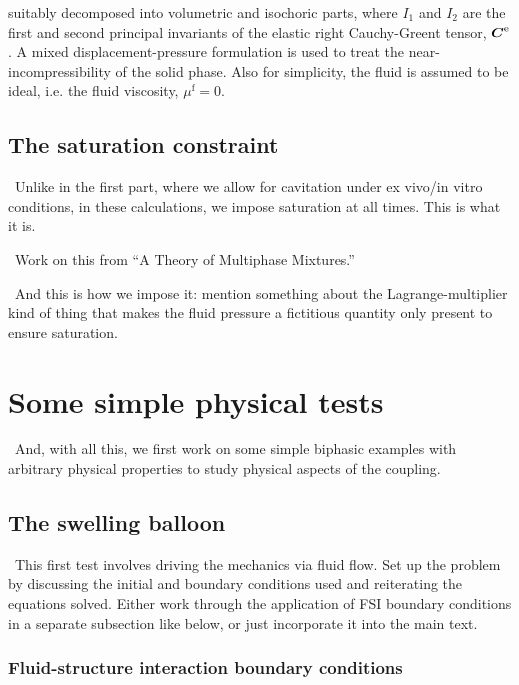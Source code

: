 \noindent suitably decomposed into volumetric and isochoric parts,
where $I_{1}$ and $I_{2}$ are the first and second principal
invariants of the elastic right Cauchy-Greent tensor,
$\mbox{\boldmath$ C$}^{\mathrm{e}}$. A mixed displacement-pressure \citep{ZienkTay:89}
formulation is used to treat the near-incompressibility of the solid
phase. Also for simplicity, the fluid is assumed to be ideal, i.e. the
fluid viscosity, $\mu^{\mathrm{f}}=0$.

\subsection{The saturation constraint}
\label{eu-saturationconstraint}

\textbullet\ Unlike in the first part, where we allow for cavitation
under ex vivo/in vitro conditions, in these calculations, we impose
saturation at all times. This is what it is.

\textbullet\ Work on this from ``A Theory of Multiphase Mixtures.''

\textbullet\ And this is how we impose it: mention something about the
Lagrange-multiplier kind of thing that makes the fluid pressure a
fictitious quantity only present to ensure saturation.

\section{Some simple physical tests}
\label{simple-physics}

\textbullet\ And, with all this, we first work on some simple biphasic
examples with arbitrary physical properties to study physical aspects
of the coupling.

\subsection{The swelling balloon}
\label{balloon}

\textbullet\ This first test involves driving the mechanics via fluid
flow. Set up the problem by discussing the initial and boundary
conditions used and reiterating the equations solved. Either work
through the application of FSI boundary conditions in a separate
subsection like below, or just incorporate it into the main text.

\subsubsection{Fluid-structure interaction boundary conditions}
\label{eu-fluid-structure-interaction}

